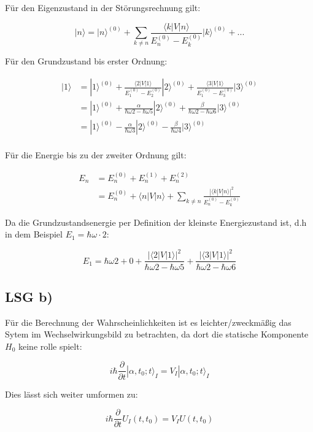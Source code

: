 Für den Eigenzustand in der Störungsrechnung gilt:

\[ |n\rangle = |n\rangle ^{(0)}+\sum_{k\neq n} \frac{\langle k|V|n\rangle }{E_n^{(0)}- E_k^{(0)}}|k\rangle ^{(0)} + ... \]

Für den Grundzustand bis erster Ordnung:

\begin{align} 
|1\rangle &= |1\rangle ^{(0)}+\frac{\langle 2|V|1\rangle }{E_1^{(0)}- E_2^{(0)}}|2\rangle ^{(0)} +  \frac{\langle 3|V|1\rangle }{E_1^{(0)}- E_3^{(0)}}|3\rangle ^{(0)} \\
&= |1\rangle ^{(0)}+\frac{\alpha }{\hbar\omega 2- \hbar\omega 5}|2\rangle ^{(0)} +  \frac{\beta }{\hbar\omega 2- \hbar\omega 6}|3\rangle ^{(0)} \\
&= |1\rangle ^{(0)}-\frac{\alpha }{\hbar\omega 3}|2\rangle ^{(0)} -  \frac{\beta }{\hbar\omega 4}|3\rangle ^{(0)} \\
\end{align}

Für die Energie bis zu der zweiter Ordnung gilt:

\begin{align}
E_n &= E_n^{(0)}+ E_n^{(1)}+E_n^{(2)} \\
&=E_n^{(0)} + \langle n|V|n\rangle + \sum_{k\neq n}\frac{|\langle
  k|V|n\rangle|^2}{E_n^{(0)}- E_k^{(0)}}
\end{align}

Da die Grundzustandsenergie per Definition der kleinste Energiezustand ist, d.h in dem Beispiel \(E_1=\hbar\omega\cdot 2\):


\[E_1 = \hbar\omega 2 + 0 +  \frac{|\langle 2|V|1\rangle|^2}{\hbar\omega 2
  -\hbar\omega 5  } + \frac{|\langle 3|V|1\rangle|^2}{\hbar\omega 2
  -\hbar\omega 6  } \]



\subsection*{LSG b)}

Für die Berechnung der Wahrscheinlichkeiten ist es leichter/zweckmäßig das Sytem im Wechselwirkungsbild zu betrachten, da dort die statische Komponente \(H_0\) keine rolle spielt:

\[i\hbar \frac{\partial}{\partial t}|\alpha,t_0;t\rangle_I = V_I|\alpha,t_0;t\rangle_I\]

Dies lässt sich weiter umformen zu:

\[ i\hbar \frac{\partial}{\partial t} U_I(t,t_0) = V_I U(t,t_0)  \]

